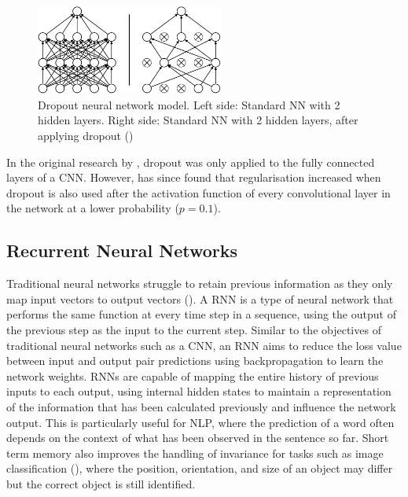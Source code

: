 \begin{figure}[ht!]
\centering
\includegraphics[width=0.55\textwidth]{media/literature/machine_learning/ml_dropout3.png}
\caption[Dropout neural network model]{Dropout neural network model. Left side: Standard \acrshort{NN} with 2 hidden layers. Right side: Standard \acrshort{NN} with 2 hidden layers, after applying dropout (\cite{srivastava_dropout_2014})}
\label{fig:cnn_dropout}
\end{figure}


In the original research by \cite{hinton_dropout_2012}, dropout was only applied to the fully connected layers of a \acrshort{CNN}. However, \cite{lai_dropout_2017} has since found that regularisation increased when dropout is also used after the activation function of every convolutional layer in the network at a lower probability ($p = 0.1$).

\subsection{Recurrent Neural Networks}

Traditional neural networks struggle to retain previous information as they only map input vectors to output vectors (\cite{graves_supervised_2012}). A \acrfull{RNN} is a type of neural network that performs the same function at every time step in a sequence, using the output of the previous step as the input to the current step.
Similar to the objectives of traditional neural networks such as a \acrshort{CNN}, an \acrshort{RNN} aims to reduce the loss value between input and output pair predictions using backpropagation to learn the network weights. 
\acrshort{RNN}s are capable of mapping the entire history of previous inputs to each output, using internal hidden states to maintain a representation of the information that has been calculated previously and influence the network output.
This is particularly useful for \acrshort{NLP}, where the prediction of a word often depends on the context of what has been observed in the sentence so far. Short term memory also improves the handling of invariance for tasks such as image classification (\cite{mikolov_recurrent_slides_2010}), where the position, orientation, and size of an object may differ but the correct object is still identified. 

